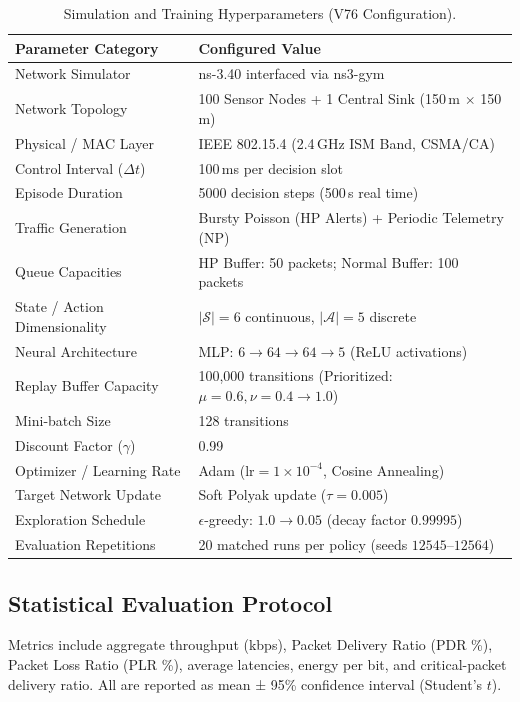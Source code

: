 \documentclass[runningheads,a4paper]{llncs}
\begin{document}
\begin{table}[t]
\centering
\caption{Simulation and Training Hyperparameters (V76 Configuration).}
\label{tab:setup}
\scriptsize
\setlength{\tabcolsep}{6pt}
\begin{tabular}{ll}
\toprule
\textbf{Parameter Category} & \textbf{Configured Value} \\
\midrule
Network Simulator & ns-3.40 interfaced via ns3-gym \\
Network Topology & 100 Sensor Nodes + 1 Central Sink (150\,m $\times$ 150\,m) \\
Physical / MAC Layer & IEEE 802.15.4 (2.4\,GHz ISM Band, CSMA/CA) \\
Control Interval ($\Delta t$) & 100\,ms per decision slot \\
Episode Duration & 5000 decision steps (500\,s real time) \\
Traffic Generation & Bursty Poisson (HP Alerts) + Periodic Telemetry (NP) \\
Queue Capacities & HP Buffer: 50 packets; Normal Buffer: 100 packets \\
State / Action Dimensionality & $|\mathcal{S}| = 6$ continuous, $|\mathcal{A}| = 5$ discrete \\
Neural Architecture & MLP: $6 \to 64 \to 64 \to 5$ (ReLU activations) \\
Replay Buffer Capacity & 100,000 transitions (Prioritized: $\mu=0.6, \nu=0.4 \to 1.0$) \\
Mini-batch Size & 128 transitions \\
Discount Factor ($\gamma$) & 0.99 \\
Optimizer / Learning Rate & Adam ($\text{lr} = 1 \times 10^{-4}$, Cosine Annealing) \\
Target Network Update & Soft Polyak update ($\tau = 0.005$) \\
Exploration Schedule & $\epsilon$-greedy: $1.0 \to 0.05$ (decay factor $0.99995$) \\
Evaluation Repetitions & 20 matched runs per policy (seeds $12545$--$12564$) \\
\bottomrule
\end{tabular}
\end{table}

\subsection{Statistical Evaluation Protocol}
Metrics include aggregate throughput (kbps), Packet Delivery Ratio (PDR \%), Packet Loss Ratio (PLR \%), average latencies, energy per bit, and critical-packet delivery ratio. All are reported as mean ± 95\% confidence interval (Student's $t$). 
\end{document}
